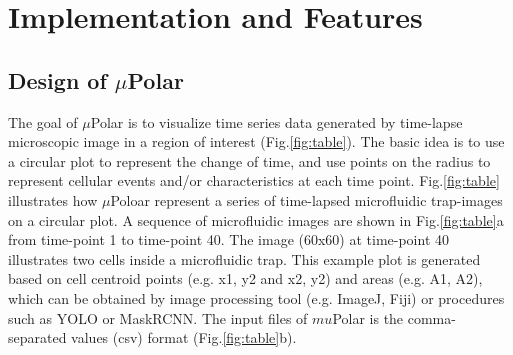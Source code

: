 \documentclass[conference]{IEEEtran}
\begin{document}

 
 
 
 
 

\section{Implementation and Features}

\subsection{Design of $\mu$Polar} 
The goal of $\mu$Polar  is to visualize time series data generated by time-lapse microscopic image in a region of interest (Fig.\ref{fig:table}). The basic idea is to use a circular plot to represent the change of time, and use points on the radius to represent cellular events and/or characteristics at each time point. 
Fig.\ref{fig:table} illustrates how $\mu$Poloar represent a series of time-lapsed microfluidic trap-images on a circular plot.  
A sequence of microfluidic images are shown in Fig.\ref{fig:table}a from time-point 1 to time-point 40. The image (60x60) at time-point 40 illustrates two cells inside a microfluidic trap. This example plot is generated  based on cell centroid points (e.g. x1, y2 and x2, y2) and areas (e.g. A1, A2), which can be obtained by image processing tool (e.g. ImageJ, Fiji) or procedures such as YOLO or MaskRCNN. The input files of $mu$Polar is the comma-separated values (csv) format (Fig.\ref{fig:table}b).   
\end{document}
